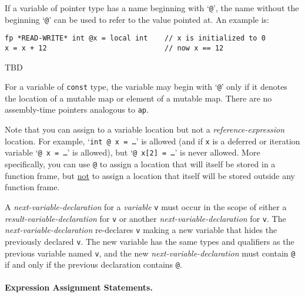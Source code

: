 \documentclass[12pt]{article}
\newcommand{\subsubsubsection}[1]{\paragraph[#1]{#1.}}
\newenvironment{indpar}[1][0.3in]%
	{\begin{list}{}%
		     {\setlength{\itemsep}{0in}%
		      \setlength{\topsep}{0in}%
		      \setlength{\parsep}{1ex}%
		      \setlength{\labelwidth}{#1}%
		      \setlength{\leftmargin}{#1}%
		      \addtolength{\leftmargin}{\labelsep}}%
	 \item}%
	{\end{list}}
\begin{document}
If a variable of pointer type has a name beginning with
`{\tt @}', the name without the beginning `{\tt @}' can
be used to refer to the value pointed at.  An example is:
\begin{indpar}\begin{verbatim}
fp *READ-WRITE* int @x = local int    // x is initialized to 0
x = x + 12                            // now x == 12
\end{verbatim}\end{indpar}

TBD

For a variable of {\tt const} type, the variable may begin with
`{\tt @}' only if it denotes the location of a mutable map or
element of a mutable map.
There are no assembly-time pointers analogous to {\tt ap}.

Note that you can assign to a variable location but not a
{\em reference-expression} location.  For example, `{\tt int @ x = \ldots}'
is allowed (and if {\tt x} is a deferred or iteration variable
`{\tt @ x = \ldots}' is allowed), but `{\tt @ x[2] = \ldots}' is never
allowed.  More specifically, you can use {\tt @} to assign a location
that will itself be stored in a function frame, but \underline{not}
to assign a location that itself will be stored outside any function
frame.

A {\em next-variable-declaration} for a {\em variable} {\tt v}
must occur in the scope of either a {\em result-variable-declaration}
for {\tt v} or another {\em next-variable-declaration} for {\tt v}.
The {\em next-variable-declaration} re-declares {\tt v} making a new
variable that hides the previously declared {\tt v}.  The new variable
has the same types and qualifiers as the previous variable named {\tt v},
and the new {\em next-variable-declaration} must contain {\tt @} if and
only if the previous declaration contains {\tt @}.

\subsubsubsection{Expression Assignment Statements}
\label{EXPRESSION-ASSIGNMENT-STATEMENTS}
\end{document}
